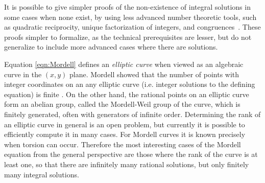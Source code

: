 \documentclass[sigplan,10pt,nonacm,
screen]{acmart} \settopmatter{printfolios=true,printccs=false,printacmref=false}
\newcommand{\nc}[1]{\todo[color=magenta]{NC: #1}}
\begin{document}
It is possible to give simpler proofs of the non-existence of integral solutions in some cases when none exist, by using less advanced number theoretic tools, such as quadratic reciprocity, unique factorization of integers, and congruences~\cite[Chapter XXIII]{dickson_history_2}.
These proofs simpler to formalize, as the technical prerequisites are lesser, but do not generalize to include more advanced cases where there are solutions.

Equation \eqref{eqn:Mordell} defines an \emph{elliptic curve} when viewed as an algebraic curve in the $(x,y)$ plane.
Mordell showed that the number of points with integer coordinates on an any elliptic curve (i.e. integer solutions to the defining equation) is finite \cite{mordell23}.
On the other hand, the rational points on an elliptic curve form an abelian group, called the Mordell-Weil group of the curve, which is finitely generated, often with generators of infinite order.
Determining the rank of an elliptic curve in general is an open problem, but currently it is possible to efficiently compute it in many cases.
For Mordell curves it is known precisely when torsion can occur. %
Therefore the most interesting cases of the Mordell equation from the general perspective are those where the rank of the curve is at least one, so that there are infinitely many rational solutions, but only finitely many integral solutions.
\end{document}
